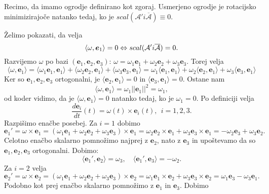 \documentclass[mat1]{fmfdelo}
\newcommand{\e}{\boldsymbol e}
\newcommand{\A}{\mathcal A}
\begin{document}
\begin{trditev} Recimo, da imamo ogrodje definirano kot zgoraj.
	Usmerjeno ogrodje je rotacijsko minimizirajoče natanko tedaj, ko je $scal(\A' i\overline{\A})\equiv0$.
\end{trditev}
\begin{dokaz}
Želimo pokazati, da velja
\begin{equation}
\langle \omega,\e_1\rangle = 0 \Leftrightarrow scal(\A' \\i\overline{\A}) = 0.
\end{equation}
Razvijemo $\omega$ po bazi $\left(\e_1,\e_2,\e_3\right)$: $\omega = \omega_1\e_1+\omega_2\e_2+\omega_3\e_3$. Torej velja
\begin{equation*}
\langle \omega, \e_1 \rangle = \langle \omega_1\e_1,\e_1\rangle + \langle \omega_2\e_2,\e_1\rangle + \langle \omega_3\e_3,\e_1\rangle= \omega_1\langle \e_1,\e_1\rangle + \omega_2\langle \e_2,\e_1\rangle + \omega_3\langle \e_3,\e_1\rangle
\end{equation*}
Ker so $\e_1,\e_2,\e_3$ ortogonalni, je  $\langle \e_2,\e_1\rangle = 0$ in $\langle \e_3,\e_1\rangle=0$.
Ostane nam
\begin{equation*}
\langle \omega,\e_1 \rangle =\omega_1 || \e_1 ||^2 = \omega_1,
\end{equation*}
od koder vidimo, da je $\langle \omega, \e_1\rangle = 0$ natanko tedaj, ko je $\omega_1 = 0$.
Po definiciji velja
\begin{equation*}
\frac{d\e_i}{dt}(t) = \omega(t) \times \e_i(t), ~~ i=1,2,3.
\end{equation*}
Razpišimo enačbe posebej. Za $i=1$ dobimo
\begin{equation*}
\e_1' = \omega \times \e_1 = (\omega_1 \e_1 + \omega_2 \e_2 + \omega_3 \e_3) \times \e_1
= \omega_2 \e_2 \times \e_1 + \omega_3 \e_3 \times \e_1 = - \omega_2\e_3 + \omega_3\e_2.
\end{equation*}
Celotno enačbo skalarno pomnožimo najprej z $\e_2$, nato z $\e_3$ in upoštevamo da so $\e_1,\e_2,\e_3$ ortogonalni. Dobimo:
\begin{equation*}
\langle \e_1', \e_2 \rangle  = \omega_3, \quad
\langle \e_1', \e_3 \rangle = -\omega_2.
\end{equation*}
Za $i=2$ velja
\begin{equation*}
\e_2' = \omega \times \e_2 = (\omega_1 \e_1 + \omega_2 \e_2 + \omega_3 \e_3) \times \e_2 =
\omega_1 \e_1 \times \e_2 + \omega_3 \e_3 \times \e_2
=\omega_1\e_3 -\omega_3\e_1.
\end{equation*}
Podobno kot prej enačbo skalarno pomnožimo z $\e_1$ in $\e_3$. Dobimo

\end{dokaz}
\end{document}
